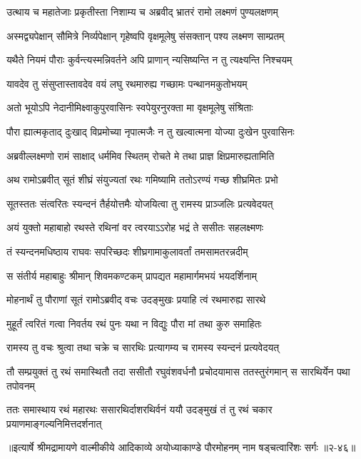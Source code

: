\twolineshloka
{उत्थाय च महातेजाः प्रकृतीस्ता निशाम्य च}
{अब्रवीद् भ्रातरं रामो लक्ष्मणं पुण्यलक्षणम्} %

\twolineshloka
{अस्मद्व्यपेक्षान् सौमित्रे निर्व्यपेक्षान् गृहेष्वपि}
{वृक्षमूलेषु संसक्तान् पश्य लक्ष्मण साम्प्रतम्} %

\twolineshloka
{यथैते नियमं पौराः कुर्वन्त्यस्मन्निवर्तने}
{अपि प्राणान् न्यसिष्यन्ति न तु त्यक्ष्यन्ति निश्चयम्} %

\twolineshloka
{यावदेव तु संसुप्तास्तावदेव वयं लघु}
{रथमारुह्य गच्छामः पन्थानमकुतोभयम्} %

\twolineshloka
{अतो भूयोऽपि नेदानीमिक्ष्वाकुपुरवासिनः}
{स्वपेयुरनुरक्ता मा वृक्षमूलेषु संश्रिताः} %

\twolineshloka
{पौरा ह्यात्मकृताद् दुःखाद् विप्रमोच्या नृपात्मजैः}
{न तु खल्वात्मना योज्या दुःखेन पुरवासिनः} %

\twolineshloka
{अब्रवील्लक्ष्मणो रामं साक्षाद् धर्ममिव स्थितम्}
{रोचते मे तथा प्राज्ञ क्षिप्रमारुह्यतामिति} %

\twolineshloka
{अथ रामोऽब्रवीत् सूतं शीघ्रं संयुज्यतां रथः}
{गमिष्यामि ततोऽरण्यं गच्छ शीघ्रमितः प्रभो} %

\twolineshloka
{सूतस्ततः संत्वरितः स्यन्दनं तैर्हयोत्तमैः}
{योजयित्वा तु रामस्य प्राञ्जलिः प्रत्यवेदयत्} %

\twolineshloka
{अयं युक्तो महाबाहो रथस्ते रथिनां वर}
{त्वरयाऽऽरोह भद्रं ते ससीतः सहलक्ष्मणः} %

\twolineshloka
{तं स्यन्दनमधिष्ठाय राघवः सपरिच्छदः}
{शीघ्रगामाकुलावर्तां तमसामतरन्नदीम्} %

\twolineshloka
{स संतीर्य महाबाहुः श्रीमान् शिवमकण्टकम्}
{प्रापद्यत महामार्गमभयं भयदर्शिनाम्} %

\twolineshloka
{मोहनार्थं तु पौराणां सूतं रामोऽब्रवीद् वचः}
{उदङ्मुखः प्रयाहि त्वं रथमारुह्य सारथे} %

\twolineshloka
{मुहूर्तं त्वरितं गत्वा निवर्तय रथं पुनः}
{यथा न विद्युः पौरा मां तथा कुरु समाहितः} %

\twolineshloka
{रामस्य तु वचः श्रुत्वा तथा चक्रे च सारथिः}
{प्रत्यागम्य च रामस्य स्यन्दनं प्रत्यवेदयत्} %

\twolineshloka
{तौ सम्प्रयुक्तं तु रथं समास्थितौ तदा ससीतौ रघुवंशवर्धनौ}
{प्रचोदयामास ततस्तुरंगमान् स सारथिर्येन पथा तपोवनम्} %

\twolineshloka
{ततः समास्थाय रथं महारथः ससारथिर्दाशरथिर्वनं ययौ}
{उदङ्मुखं तं तु रथं चकार प्रयाणमाङ्गल्यनिमित्तदर्शनात्} %


॥इत्यार्षे श्रीमद्रामायणे वाल्मीकीये आदिकाव्ये अयोध्याकाण्डे पौरमोहनम् नाम षड्चत्वारिंशः सर्गः ॥२-४६॥
